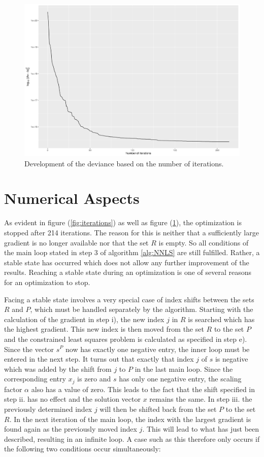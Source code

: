 \begin{figure}
	\centering
	\includegraphics[width=\textwidth]{figures/chapter_NNLS/residuals}
	\caption{Development of the deviance based on the number of iterations.}
	\label{fig:residuals}
\end{figure}

\section{Numerical Aspects}
As evident in figure (\ref{fig:iterations}) as well as figure (\ref{fig:residuals}), the optimization is stopped after 214 iterations. The reason for this is neither that a sufficiently large gradient is no longer available nor that the set $R$ is empty. So all conditions of the main loop stated in step 3 of algorithm \ref{alg:NNLS} are still fulfilled. 
Rather, a stable state has occurred which does not allow any further improvement of the results. Reaching a stable state during an optimization is one of several reasons for an optimization to stop.

Facing a stable state involves a very special case of index shifts between the sets $R$ and $P$, which must be handled separately by the algorithm. Starting with the calculation of the gradient in step i), the new index $j$ in $R$ is searched which has the highest gradient. This new index is then moved from the set $R$ to the set $P$ and the constrained least squares problem is calculated as specified in step e). Since the vector $s^P$ now has exactly one negative entry, the inner loop must be entered in the next step. It turns out that exactly that index $j$ of $s$ is negative which was added by the shift from $j$ to $P$ in the last main loop. 
Since the corresponding entry $x_j$ is zero and $s$ has only one negative entry, the scaling factor $\alpha$ also has a value of zero. This leads to the fact that the shift specified in step ii. has no effect and the solution vector $x$ remains the same. In step iii. the previously determined index $j$ will then be shifted back from the set $P$ to the set $R$. In the next iteration of the main loop, the index with the largest gradient is found again as the previously moved index $j$. This will lead to what has just been described, resulting in an infinite loop. A case such as this therefore only occurs if the following two conditions occur simultaneously: 

